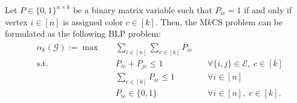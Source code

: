 \documentclass[11pt, a4paper]{article}
\newcommand{\mc}{\mathcal}
\begin{document}
Let $P \in \{0,1\}^{n \times k}$ be a binary matrix variable such that $P_{ic}=1$ if and only if vertex $i \in [n]$ is assigned color $c \in [k]$. 
Then, the M$k$CS problem can be formulated as the following BLP problem: 
\begin{align} \tag{BLP$_k$} \label{BLP} &\begin{aligned}
    \alpha_k(\mc{G}) := \max \quad & \sum_{i \in [n]} \sum_{c \in [k]} P_{ic} \\
    \text{s.t.} \quad & P_{ic} + P_{jc} \leq 1 & \quad \forall \{i,j\} \in \mc{E}, \; c \in [k] \,\\
    & \sum_{c \in [k]}P_{ic} \leq 1 & \quad \forall i \in [n]\, \\
    & P_{ic} \in \{0,1\} & \quad \forall i \in [n], \; c \in [k].
\end{aligned} \end{align}
\end{document}
